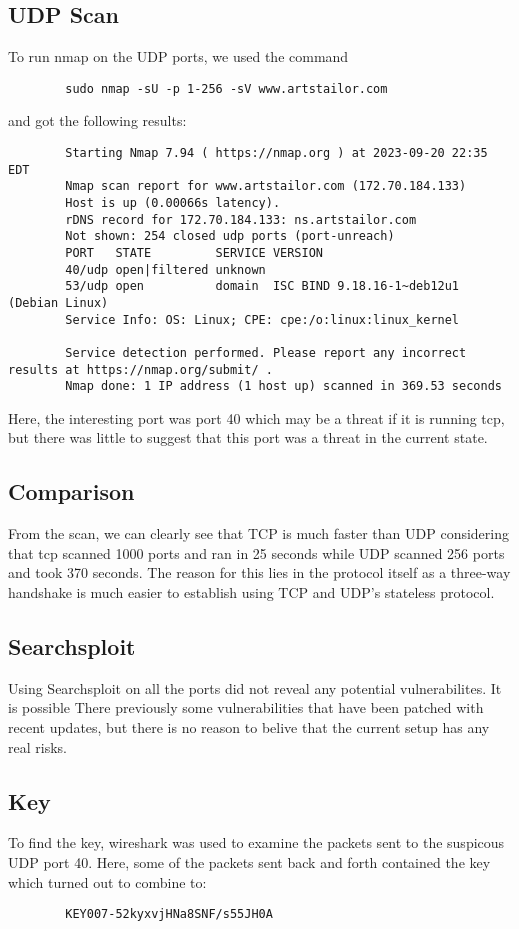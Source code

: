 \documentclass[notitlepage]{article}
\begin{document}
\subsection{UDP Scan}
    To run nmap on the UDP ports, we used the command
    \begin{verbatim}
        sudo nmap -sU -p 1-256 -sV www.artstailor.com
    \end{verbatim}
    and got the following results:
     \begin{verbatim}
        Starting Nmap 7.94 ( https://nmap.org ) at 2023-09-20 22:35 EDT
        Nmap scan report for www.artstailor.com (172.70.184.133)
        Host is up (0.00066s latency).
        rDNS record for 172.70.184.133: ns.artstailor.com
        Not shown: 254 closed udp ports (port-unreach)
        PORT   STATE         SERVICE VERSION
        40/udp open|filtered unknown
        53/udp open          domain  ISC BIND 9.18.16-1~deb12u1 (Debian Linux)
        Service Info: OS: Linux; CPE: cpe:/o:linux:linux_kernel

        Service detection performed. Please report any incorrect results at https://nmap.org/submit/ .
        Nmap done: 1 IP address (1 host up) scanned in 369.53 seconds    
     \end{verbatim}
    Here, the interesting port was port 40 which may be a threat if it is running tcp, but there was little
    to suggest that this port was a threat in the current state.

\subsection{Comparison}
    From the scan, we can clearly see that TCP is much faster than UDP considering that tcp scanned
    1000 ports and ran in 25 seconds while UDP scanned 256 ports and took 370 seconds. The reason
    for this lies in the protocol itself as a three-way handshake is much easier to establish
    using TCP and UDP's stateless protocol.

\subsection{Searchsploit}
    Using Searchsploit on all the ports did not reveal any potential vulnerabilites. It is possible
    There previously some vulnerabilities that have been patched with recent updates, but 
    there is no reason to belive that the current setup has any real risks.

\subsection{Key}
    To find the key, wireshark was used to examine the packets sent to the suspicous UDP port 40.
    Here, some of the packets sent back and forth contained the key which turned out to combine to:
    \begin{verbatim}
        KEY007-52kyxvjHNa8SNF/s55JH0A
    \end{verbatim}
\end{document}
